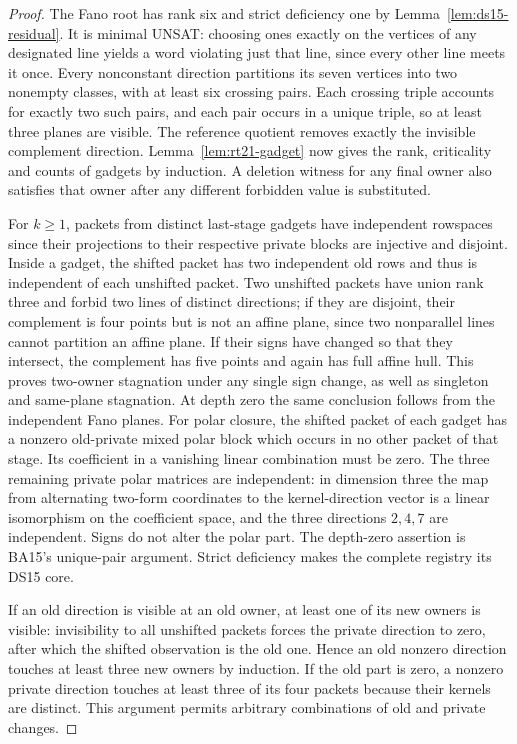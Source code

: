 \documentclass[11pt]{article}
\begin{document}
\begin{proof}
The Fano root has rank six and strict deficiency one by Lemma~\ref{lem:ds15-residual}. It is minimal UNSAT: choosing ones exactly on the vertices of any designated line yields a word violating just that line, since every other line meets it once. Every nonconstant direction partitions its seven vertices into two nonempty classes, with at least six crossing pairs. Each crossing triple accounts for exactly two such pairs, and each pair occurs in a unique triple, so at least three planes are visible. The reference quotient removes exactly the invisible complement direction. Lemma~\ref{lem:rt21-gadget} now gives the rank, criticality and counts of gadgets by induction. A deletion witness for any final owner also satisfies that owner after any different forbidden value is substituted.

For $k\ge1$, packets from distinct last-stage gadgets have independent rowspaces since their projections to their respective private blocks are injective and disjoint. Inside a gadget, the shifted packet has two independent old rows and thus is independent of each unshifted packet. Two unshifted packets have union rank three and forbid two lines of distinct directions; if they are disjoint, their complement is four points but is not an affine plane, since two nonparallel lines cannot partition an affine plane. If their signs have changed so that they intersect, the complement has five points and again has full affine hull. This proves two-owner stagnation under any single sign change, as well as singleton and same-plane stagnation. At depth zero the same conclusion follows from the independent Fano planes. For polar closure, the shifted packet of each gadget has a nonzero old-private mixed polar block which occurs in no other packet of that stage. Its coefficient in a vanishing linear combination must be zero. The three remaining private polar matrices are independent: in dimension three the map from alternating two-form coordinates to the kernel-direction vector is a linear isomorphism on the coefficient space, and the three directions $2,4,7$ are independent. Signs do not alter the polar part. The depth-zero assertion is BA15's unique-pair argument. Strict deficiency makes the complete registry its DS15 core.

If an old direction is visible at an old owner, at least one of its new owners is visible: invisibility to all unshifted packets forces the private direction to zero, after which the shifted observation is the old one. Hence an old nonzero direction touches at least three new owners by induction. If the old part is zero, a nonzero private direction touches at least three of its four packets because their kernels are distinct. This argument permits arbitrary combinations of old and private changes.


\end{proof}
\end{document}
